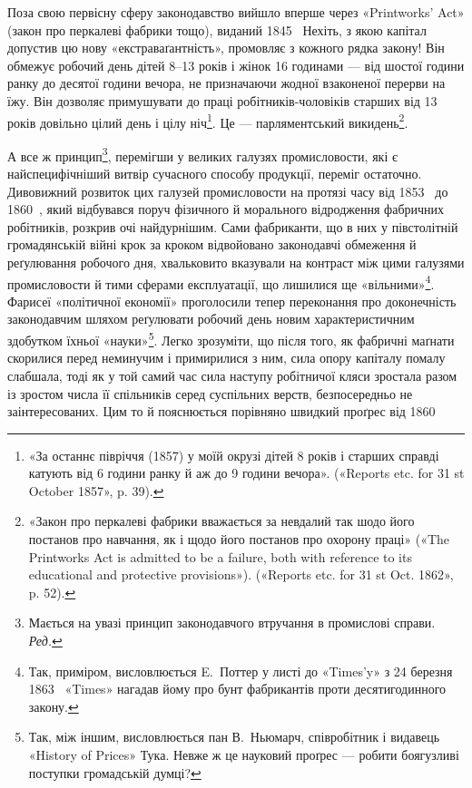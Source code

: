 Поза свою первісну сферу законодавство вийшло вперше через
«Printworks’ Act» (закон про перкалеві фабрики тощо), виданий
1845~ Нехіть, з якою капітал допустив цю нову «екстраваґантність»,
промовляє з кожного рядка закону! Він обмежує
робочий день дітей 8--13 років і жінок 16 годинами — від шостої
години ранку до десятої години вечора, не призначаючи жодної
взаконеної перерви на їжу. Він дозволяє примушувати до праці
робітників-чоловіків старших від 13 років довільно цілий
день і цілу ніч\footnote{
«За останнє півріччя (1857) у моїй окрузі дітей 8 років і старших
справді катують від 6 години ранку й аж до 9 години вечора». («Reports
etc. for 31 st October 1857», p. 39).
}. Це — парляментський викидень\footnote{
«Закон про перкалеві фабрики вважається за невдалий так шодо його
постанов про навчання, як і щодо його постанов про охорону праці» («The Printworks Act is admitted to be a failure, both with reference to its educational
and protective provisions»). («Reports etc. for 31 st Oct. 1862», p. 52).
}.

А все ж принцип\footnote*{
Мається на увазі принцип законодавчого втручання в промислові
справи. \emph{Ред.}
}, перемігши у великих галузях промисловости,
які є найспецифічніший витвір сучасного способу продукції,
переміг остаточно. Дивовижний розвиток цих галузей промисловости
на протязі часу від 1853~ до 1860~, який відбувався
поруч фізичного й морального відродження фабричних робітників,
розкрив очі найдурнішим. Сами фабриканти, що в них у
півстолітній громадянській війні крок за кроком відвойовано
законодавчі обмеження й реґулювання робочого дня, хвальковито
вказували на контраст між цими галузями промисловости
й тими сферами експлуатації, що лишилися ще «вільними»\footnote{
Так, приміром, висловлюється E.~Поттер у листі до «Times’y»
з 24 березня 1863~ «Times» нагадав йому про бунт фабрикантів проти
десятигодинного закону.
}.
Фарисеї «політичної економії» проголосили тепер переконання
про доконечність законодавчим шляхом реґулювати робочий день
новим характеристичним здобутком їхньої «науки»\footnote{
Так, між іншим, висловлюється пан В.~Ньюмарч, співробітник
і видавець «History of Prices» Тука. Невже ж це науковий проґрес —
робити боягузливі поступки громадській думці?
}. Легко
зрозуміти, що після того, як фабричні маґнати скорилися перед
неминучим і примирилися з ним, сила опору капіталу помалу
слабшала, тоді як у той самий час сила наступу робітничої кляси
зростала разом із зростом числа її спільників серед суспільних
верств, безпосередньо не заінтересованих. Цим то й пояснюється
порівняно швидкий проґрес від 1860~

